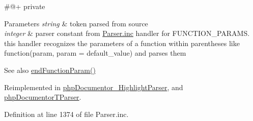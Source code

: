 \#@+  private 
\begin{DoxyParams}{\-Parameters}
{\em string} & token parsed from source \\
\hline
{\em integer} & parser constant from \hyperlink{_parser_8inc}{\-Parser.\-inc} handler for \-F\-U\-N\-C\-T\-I\-O\-N\-\_\-\-P\-A\-R\-A\-M\-S. this handler recognizes the parameters of a function within parentheses like function(param, param = default\-\_\-value) and parses them \\
\hline
\end{DoxyParams}
\begin{DoxySeeAlso}{\-See also}
\hyperlink{class_parser_a1bf75b45723f236dc492dd5e1d9bebaf}{end\-Function\-Param()} 
\end{DoxySeeAlso}


\-Reimplemented in \hyperlink{classphp_documentor___highlight_parser_aabdf4a71f7610ba56a173ea10c5f541b}{php\-Documentor\-\_\-\-Highlight\-Parser}, and \hyperlink{classphp_documentor_t_parser_aabdf4a71f7610ba56a173ea10c5f541b}{php\-Documentor\-T\-Parser}.



\-Definition at line 1374 of file \-Parser.\-inc.


